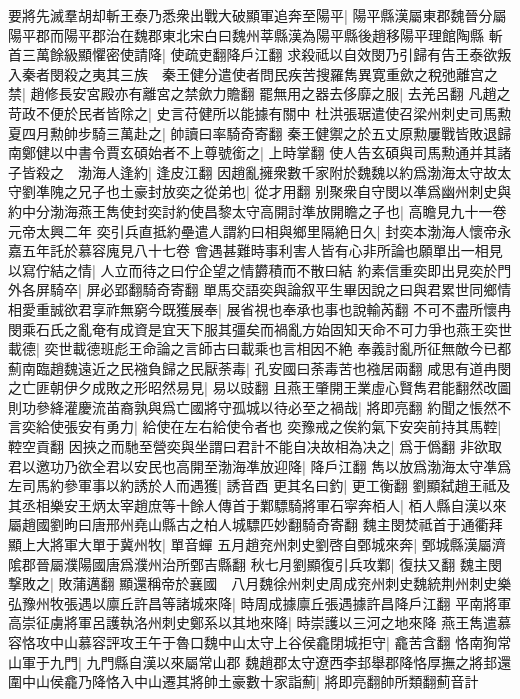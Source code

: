 要將先滅羣胡却斬王泰乃悉衆出戰大破顯軍追奔至陽平|{
	陽平縣漢屬東郡魏晉分屬陽平郡而陽平郡治在魏郡東北宋白曰魏州莘縣漢為陽平縣後趙移陽平理館陶縣}
斬首三萬餘級顯懼密使請降|{
	使疏吏翻降戶江翻}
求殺祗以自效閔乃引歸有告王泰欲叛入秦者閔殺之夷其三族　秦王健分遣使者問民疾苦搜羅雋異寛重歛之稅弛離宫之禁|{
	趙修長安宮殿亦有離宮之禁歛力贍翻}
罷無用之器去侈靡之服|{
	去羌呂翻}
凡趙之苛政不便於民者皆除之|{
	史言苻健所以能據有關中}
杜洪張琚遣使召梁州刺史司馬勲夏四月勲帥步騎三萬赴之|{
	帥讀曰率騎奇寄翻}
秦王健禦之於五丈原勲屢戰皆敗退歸南鄭健以中書令賈玄碩始者不上尊號銜之|{
	上時掌翻}
使人告玄碩與司馬勲通并其諸子皆殺之　渤海人逢約|{
	逢皮江翻}
因趙亂擁衆數千家附於魏魏以約爲渤海太守故太守劉凖隗之兄子也土豪封放奕之從弟也|{
	從才用翻}
别聚衆自守閔以凖爲幽州刺史與約中分渤海燕王雋使封奕討約使昌黎太守高開討準放開瞻之子也|{
	高瞻見九十一卷元帝太興二年}
奕引兵直抵約壘遣人謂約曰相與鄉里隔絶日久|{
	封奕本渤海人懷帝永嘉五年託於慕容廆見八十七卷}
會遇甚難時事利害人皆有心非所論也願單出一相見以寫佇結之情|{
	人立而待之曰佇企望之情欝積而不散曰結}
約素信重奕即出見奕於門外各屏騎卒|{
	屏必郢翻騎奇寄翻}
單馬交語奕與論叙平生畢因說之曰與君累世同鄉情相愛重誠欲君享祚無窮今既獲展奉|{
	展省視也奉承也事也說輸芮翻}
不可不盡所懷冉閔乘石氏之亂奄有成資是宜天下服其彊矣而禍亂方始固知天命不可力爭也燕王奕世載德|{
	奕世載德班彪王命論之言師古曰載乘也言相因不絶}
奉義討亂所征無敵今已都薊南臨趙魏遠近之民襁負歸之民厭荼毒|{
	孔安國曰荼毒苦也襁居兩翻}
咸思有道冉閔之亡匪朝伊夕成敗之形昭然易見|{
	易以豉翻}
且燕王肇開王業虛心賢雋君能翻然改圖則功參絳灌慶流苖裔孰與爲亡國將守孤城以待必至之禍哉|{
	將即亮翻}
約聞之悵然不言奕給使張安有勇力|{
	給使在左右給使令者也}
奕豫戒之俟約氣下安突前持其馬鞚|{
	鞚空貢翻}
因挾之而馳至營奕與坐謂曰君計不能自决故相為决之|{
	爲于僞翻}
非欲取君以邀功乃欲全君以安民也高開至渤海凖放迎降|{
	降戶江翻}
雋以放爲渤海太守凖爲左司馬約參軍事以約誘於人而遇獲|{
	誘音酉}
更其名曰釣|{
	更工衡翻}
劉顯弑趙王祗及其丞相樂安王炳太宰趙庶等十餘人傳首于鄴驃騎將軍石寜奔栢人|{
	栢人縣自漢以來屬趙國劉昫曰唐邢州堯山縣古之柏人城驃匹妙翻騎奇寄翻}
魏主閔焚祗首于通衢拜顯上大將軍大單于冀州牧|{
	單音蟬}
五月趙兖州刺史劉啓自鄄城來奔|{
	鄄城縣漢屬濟隂郡晉屬濮陽國唐爲濮州治所鄄吉縣翻}
秋七月劉顯復引兵攻鄴|{
	復扶又翻}
魏主閔撃敗之|{
	敗蒲邁翻}
顯還稱帝於襄國　八月魏徐州刺史周成兖州刺史魏統荆州刺史樂弘豫州牧張遇以廪丘許昌等諸城來降|{
	時周成據廪丘張遇據許昌降戶江翻}
平南將軍高崇征虜將軍呂護執洛州刺史鄭系以其地來降|{
	時崇護以三河之地來降}
燕王雋遣慕容恪攻中山慕容評攻王午于魯口魏中山太守上谷侯龕閉城拒守|{
	龕苦含翻}
恪南狥常山軍于九門|{
	九門縣自漢以來屬常山郡}
魏趙郡太守遼西李邽舉郡降恪厚撫之將邽還圍中山侯龕乃降恪入中山遷其將帥土豪數十家詣薊|{
	將即亮翻帥所類翻薊音計}
